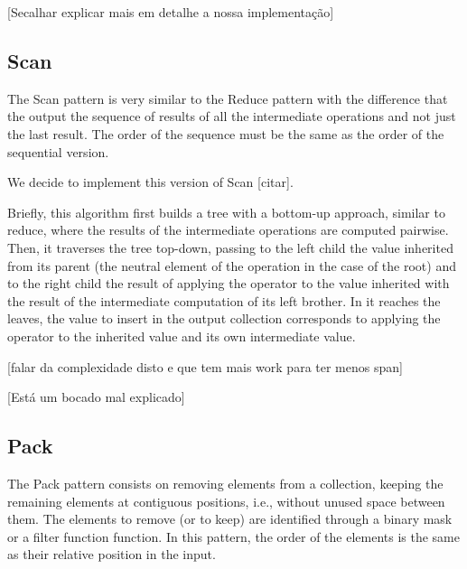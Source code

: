 \documentclass[conference,compsoc]{IEEEtran}
\begin{document}
[Secalhar explicar mais em detalhe a nossa implementação]



\subsection{Scan}

The Scan pattern is very similar to the Reduce pattern with the difference that the output the sequence of results of all the intermediate operations and not just the last result. The order of the sequence must be the same as the order of the sequential version.

We decide to implement this version of Scan [citar].

Briefly, this algorithm first builds a tree with a bottom-up approach, similar to reduce, where the results of the intermediate operations are computed pairwise. Then, it traverses the tree top-down, passing to the left child the value inherited from its parent (the neutral element of the operation in the case of the root) and to the right child the result of applying the operator to the value inherited with the result of the intermediate computation of its left brother. In it reaches the leaves, the value to insert in the output collection corresponds to applying the operator to the inherited value and its own intermediate value.

[falar da complexidade disto e que tem mais work para ter menos span]

[Está um bocado mal explicado]

\subsection{Pack}

The Pack pattern consists on removing elements from a collection, keeping the remaining elements at contiguous positions, i.e., without unused space between them. The elements to remove (or to keep) are identified through a binary mask or a filter function function. In this pattern, the order of the elements is the same as their relative position in the input.
\end{document}
